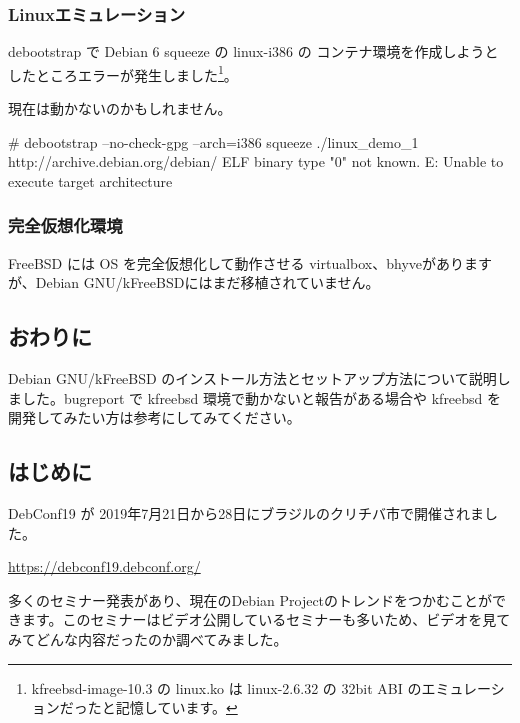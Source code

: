 \documentclass[mingoth,a4paper]{jsarticle}
\begin{document}
\subsubsection{Linuxエミュレーション}

debootstrap で Debian 6 squeeze の linux-i386 の コンテナ環境を作成しようとしたところエラーが発生しました\footnote{kfreebsd-image-10.3 の linux.ko は linux-2.6.32 の 32bit ABI のエミュレーションだったと記憶しています。}。

現在は動かないのかもしれません。

\begin{commandline}
# debootstrap --no-check-gpg --arch=i386 squeeze ./linux_demo_1 http://archive.debian.org/debian/
ELF binary type "0" not known.
E: Unable to execute target architecture
\end{commandline}


\subsubsection{完全仮想化環境}

FreeBSD には OS を完全仮想化して動作させる virtualbox、bhyveがありますが、Debian GNU/kFreeBSDにはまだ移植されていません。


\subsection{おわりに}

Debian GNU/kFreeBSD のインストール方法とセットアップ方法について説明しました。bugreport で kfreebsd 環境で動かないと報告がある場合や kfreebsd を開発してみたい方は参考にしてみてください。


\subsection{はじめに}

DebConf19 が 2019年7月21日から28日にブラジルのクリチバ市で開催されました。

\url{https://debconf19.debconf.org/}

多くのセミナー発表があり、現在のDebian Projectのトレンドをつかむことができます。このセミナーはビデオ公開しているセミナーも多いため、ビデオを見てみてどんな内容だったのか調べてみました。
\end{document}
